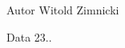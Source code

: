 \begin{DoxyAuthor}{Autor}
Witold Zimnicki 
\end{DoxyAuthor}
\begin{DoxyDate}{Data}
23.. 
\end{DoxyDate}
